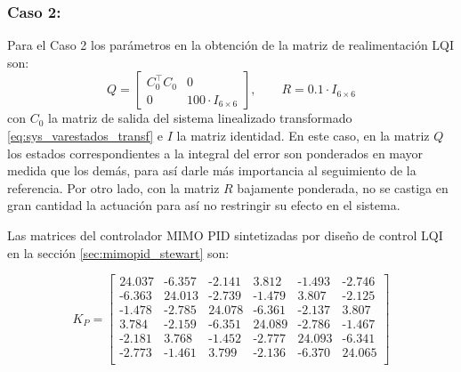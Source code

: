 \subsubsection{Caso 2:}
Para el Caso 2 los parámetros en la obtención de la matriz de realimentación LQI son:
\begin{equation}
    Q = \begin{bmatrix} C_0^\top C_0 & 0 \\ 0 & 100\cdot I_{6\times6} \end{bmatrix}, \qquad R = 0.1\cdot I_{6\times6} 
\end{equation}
con $C_0$ la matriz de salida del sistema linealizado transformado \ref{eq:sys_varestados_transf} e $I$ la matriz identidad. En este caso, en la matriz $Q$ los estados correspondientes a la integral del error son ponderados en mayor medida que los demás, para así darle más importancia al seguimiento de la referencia. Por otro lado, con la matriz $R$ bajamente ponderada, no se castiga en gran cantidad la actuación para así no restringir su efecto en el sistema.

Las matrices del controlador MIMO PID sintetizadas por diseño de control LQI en la sección \ref{sec:mimopid_stewart} son:

\begin{equation} \label{eq:KP_mimoPID}
    K_P = \begin{bmatrix}
        24.037 &	\textrm{-}6.357 &	\textrm{-}2.141 &	3.812 &	\textrm{-}1.493 &	\textrm{-}2.746 \\
        \textrm{-}6.363 &	24.013 &	\textrm{-}2.739 &	\textrm{-}1.479 &	3.807 &	\textrm{-}2.125 \\
        \textrm{-}1.478 &	\textrm{-}2.785 &	24.078 &	\textrm{-}6.361 &	\textrm{-}2.137 &	3.807 \\
        3.784 &	\textrm{-}2.159 &	\textrm{-}6.351 &	24.089 &	\textrm{-}2.786 &	\textrm{-}1.467 \\
        \textrm{-}2.181 &	3.768 &	\textrm{-}1.452 &	\textrm{-}2.777 &	24.093 &	\textrm{-}6.341 \\
        \textrm{-}2.773 &	\textrm{-}1.461 &	3.799 &	\textrm{-}2.136 &	\textrm{-}6.370 &	24.065 \\
    \end{bmatrix}
\end{equation}

